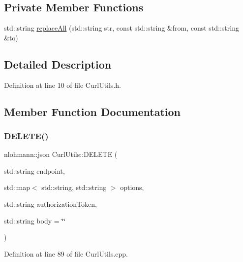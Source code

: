 \subsection*{Private Member Functions}
\begin{DoxyCompactItemize}
\item 
std\+::string \mbox{\hyperlink{class_curl_utils_a86211746c9f0981b56fd143996a10a4a}{replace\+All}} (std\+::string str, const std\+::string \&from, const std\+::string \&to)
\end{DoxyCompactItemize}


\subsection{Detailed Description}


Definition at line 10 of file Curl\+Utils.\+h.



\subsection{Member Function Documentation}
\mbox{\label{class_curl_utils_aa78fe6e8b55d787002b7089e70473558}} 
\subsubsection{\texorpdfstring{D\+E\+L\+E\+T\+E()}{DELETE()}}
{\footnotesize\ttfamily nlohmann\+::json Curl\+Utils\+::\+D\+E\+L\+E\+TE (\begin{DoxyParamCaption}\item[{std\+::string}]{endpoint,  }\item[{std\+::map$<$ std\+::string, std\+::string $>$}]{options,  }\item[{std\+::string}]{authorization\+Token,  }\item[{std\+::string}]{body = {\ttfamily \char`\"{}\char`\"{}} }\end{DoxyParamCaption})}



Definition at line 89 of file Curl\+Utils.\+cpp.

